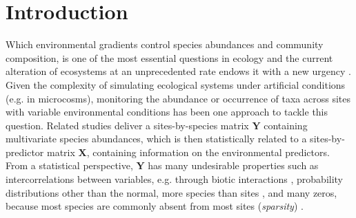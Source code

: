 \documentclass[a4paper,11pt]{article}
\begin{document}
\newpage

\section{Introduction}


	Which environmental gradients control species abundances and community composition, is one of the most essential questions in ecology \citep[e.g.][]{Clements1907}  and the current alteration of ecosystems at an unprecedented rate endows it with a new urgency \citep{pacifici2015assessing}. 
	Given the complexity of simulating ecological systems under artificial conditions (e.g. in microcosms), monitoring the abundance or occurrence of taxa across sites with variable  environmental conditions has been one approach to tackle this question.
	Related studies deliver a sites-by-species matrix $\mathbf{Y}$ containing multivariate species abundances, which is then statistically related to  a sites-by-predictor matrix $\mathbf{X}$, containing information on the environmental predictors.
	From a statistical perspective, $\mathbf{Y}$ has many undesirable properties such as
	intercorrelations between variables, 
	e.g. through biotic interactions \citep{morales2015inferring},
	probability distributions other than the normal, 
	more species than sites \citep[\textit{high dimensionality}, especially in DNA barcoding studies, ][]{cristescu2014barcoding},  
	and many zeros, because most species are commonly absent from most sites (\textit{sparsity}) \citep{mcgill2007species}. 
	
    
\end{document}
